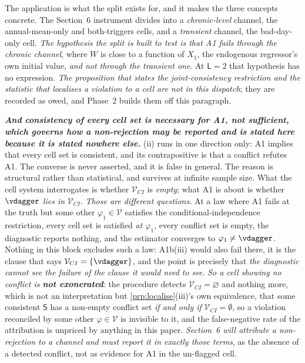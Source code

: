 The application is what the split exists for, and it makes the three concepts concrete. The
Section~6 instrument divides into a \emph{chronic-level} channel, the annual-mean-only and
both-triggers cells, and a \emph{transient} channel, the bad-day-only cell. \emph{The hypothesis the
split is built to test is that A1 fails through the chronic channel}, where $W$ is close to a function of
$X_1$, the endogenous regressor's own initial value, \emph{and not through the transient one}. At
$\mathsf L=2$ that hypothesis has no expression. \emph{The proposition that states the joint-consistency
restriction and the statistic that localises a violation to a cell are not in this dispatch}; they are
recorded as owed, and Phase~2 builds them off this paragraph.

\emph{\textbf{And consistency of every cell set is \textbf{necessary} for A1, not sufficient, which
governs how a non-rejection may be reported and is stated here because it is stated nowhere else.}}
\textup{(ii)} runs in one direction only: A1 implies that every cell set is
consistent, and its contrapositive is that a conflict refutes A1. The converse is never asserted,
and it is false in general. The reason is structural rather than statistical, and survives at infinite
sample size. What the cell system interrogates is whether $\mathcal V_{CI}$ is \emph{empty}; what A1 is
about is whether $\vdagger$ \emph{lies in} $\mathcal V_{CI}$. \emph{Those are different questions.} At a
law where A1 fails at the truth but some other $\varphi_1\in\mathcal V$ satisfies the
conditional-independence restriction, every cell set is satisfied \emph{at $\varphi_1$}, every conflict
set is empty, the diagnostic reports nothing, and the estimator converges to $\varphi_1\ne\vdagger$.
Nothing in this block excludes such a law: A1b(iii) would also fail there, it is the clause that says
$\mathcal V_{CI}=\{\vdagger\}$, and the point is precisely that \emph{the diagnostic cannot see the
failure of the clause it would need to see}.
\emph{So a cell showing no conflict is \textbf{not exonerated}}: the procedure detects
$\mathcal V_{CI}=\varnothing$ and nothing more, which is not an interpretation but
\cref{prp:localise}\textup{(iii)}'s own equivalence, that some consistent $\mathsf S$ has a non-empty
conflict set \emph{if and only if} $\mathcal V_{CI}=\emptyset$, so a violation reconciled by some other
$\varphi\in\mathcal V$ is invisible to it, and the false-negative rate of the attribution is
unpriced by anything in this paper. \emph{Section~6 will attribute a non-rejection to a channel and must report it in exactly those
terms}, as the absence of a detected conflict, not as evidence for A1 in the un-flagged cell.
